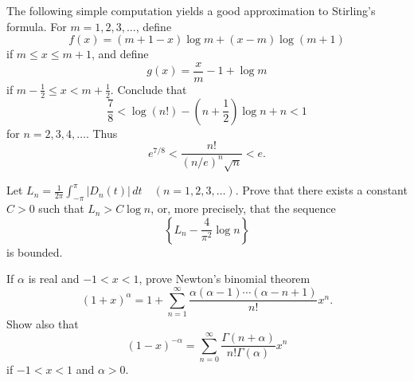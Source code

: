   \begin{exercise}[Rudin 8.20]
    The following simple computation yields a good approximation to Stirling's formula. For $m = 1, 2, 3, \dots$, define
    \begin{equation}
      f(x) = (m+1-x) \log m + (x-m) \log (m+1)
    \end{equation}
    if $m \leq x \leq m+1$, and define
    \begin{equation}
      g(x) = \frac{x}{m} - 1 + \log m
    \end{equation}
    if $m - \frac{1}{2} \leq x < m + \frac{1}{2}$. Conclude that
    \begin{equation}
      \frac{7}{8} < \log(n!) - (n + \frac{1}{2}) \log n + n < 1
    \end{equation}
    for $n = 2, 3, 4, \dots$. Thus
    \begin{equation}
      e^{7/8} < \frac{n!}{(n/e)^n \sqrt{n}} < e.
    \end{equation}
  \end{exercise}
  \begin{solution}

  \end{solution}

  \begin{exercise}[Rudin 8.21]
    Let $L_n = \frac{1}{2\pi} \int_{-\pi}^\pi |D_n(t)| \, dt \quad (n = 1, 2, 3, \dots)$. Prove that there exists a constant $C > 0$ such that $L_n > C \log n$, or, more precisely, that the sequence
    \begin{equation}
      \left\{ L_n - \frac{4}{\pi^2} \log n \right\}
    \end{equation}
    is bounded.
  \end{exercise}
  \begin{solution}

  \end{solution}

  \begin{exercise}[Rudin 8.22]
    If $\alpha$ is real and $-1 < x < 1$, prove Newton's binomial theorem
    \begin{equation}
      (1+x)^\alpha = 1 + \sum_{n=1}^\infty \frac{\alpha(\alpha-1) \cdots (\alpha-n+1)}{n!} x^n.
    \end{equation}
    Show also that
    \begin{equation}
      (1-x)^{-\alpha} = \sum_{n=0}^\infty \frac{\Gamma (n+\alpha)}{n! \Gamma(\alpha)} x^n
    \end{equation}
    if $-1 < x < 1$ and $\alpha > 0$.
  \end{exercise}
  \begin{solution}

  \end{solution}


